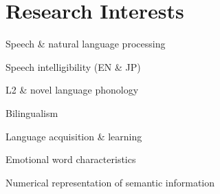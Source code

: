 \documentclass[letterpaper]{deedy-resume} %
\begin{document}

\lastupdated %


\section{Research Interests}
\vspace{\topsep} %
\begin{tightitemize}
\item Speech \& natural language processing 
\item Speech intelligibility (EN \& JP) 
\item L2 \& novel language phonology 
\item Bilingualism 
\item Language acquisition \& learning 
\item Emotional word characteristics
\item Numerical representation of semantic information 
\end{tightitemize}
\sectionspace

\end{document}
